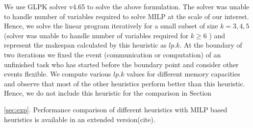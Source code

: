 \documentclass[sigconf]{acmart}
\begin{document}
	
	We use GLPK solver v4.65 to solve the above formulation. The solver was unable to handle number of variables required to solve MILP at the scale of our interest. Hence, we solve the linear program iteratively for a small subset of size $k=3,4,5$ (solver was unable to handle number of variables required for $k\ge6$ ) and represent the makespan calculated by this heuristic as $lp.k$. At the boundary of two iterations we fixed the event (communication or computation) of an unfinished task who has started before the boundary point and consider other events flexible. We compute various $lp.k$ values for different memory capacities and observe that most of the other heuristics perform better than this heuristic. Hence, we do not include this heuristic for the comparison in Section~{\ref{sec:exp}. Performance comparison of different heuristics with MILP based heuristics is available in an extended version(cite).
		
}
\end{document}
